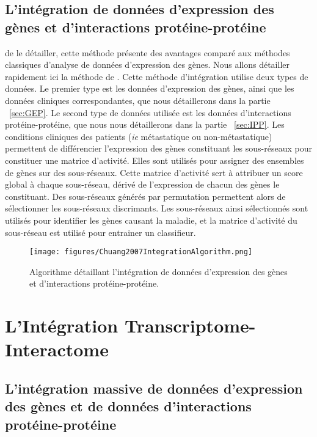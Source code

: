 		\subsection{\textcolor{green!45!black}{L'intégration de données d'expression des gènes et d'interactions protéine-protéine}}
			 de le détailler, cette méthode présente des avantages comparé aux méthodes classiques d'analyse de données d'expression des gènes.
			Nous allons détailler rapidement ici la méthode de \citeauthor{Chuang2007}.
			Cette méthode d'intégration utilise deux types de données.
			Le premier type est les données d'expression des gènes, ainsi que les données cliniques correspondantes, que nous détaillerons dans la partie ~\ref{sec:GEP}.
			Le second type de données utilisée est les données d'interactions protéine-protéine, que nous nous détaillerons dans la partie ~\ref{sec:IPP}.
			Les conditions cliniques des patients (\emph{ie} métastatique ou non-métastatique) permettent de différencier l'expression des gènes constituant les sous-réseaux pour constituer une matrice d'activité.
			Elles sont utilisés pour assigner des ensembles de gènes sur des sous-réseaux.
			Cette matrice d'activité sert à attribuer un score global à chaque sous-réseau, dérivé de l'expression de chacun des gènes le constituant.
			Des sous-réseaux générés par permutation permettent alors de sélectionner les sous-réseaux discrimants.
			Les sous-réseaux ainsi sélectionnés sont utilisés pour identifier les gènes causant la maladie, et la matrice d'activité du sous-réseau est utilisé pour entrainer un classifieur.

			\begin{figure}
				\centering
				\texttt{[image: figures/Chuang2007IntegrationAlgorithm.png]}
				\caption{Algorithme détaillant l'intégration de données d'expression des gènes et d'interactions protéine-protéine\citep{Chuang2007}.}
				\label{fig:Chuang2007IntegrationAlgorithm}
			\end{figure}
		
	\section{\textcolor{green!45!black}{L'Intégration Transcriptome-Interactome}}

		\subsection{\textcolor{green!45!black}{L'intégration massive de données d'expression des gènes et de données d'interactions protéine-protéine}}

